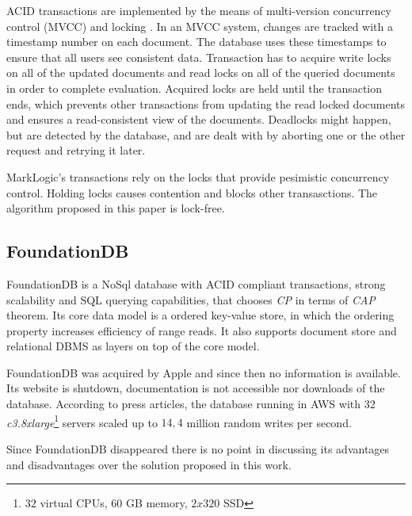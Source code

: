 ACID transactions are implemented by the means of multi-version concurrency control (MVCC) and locking \cite{markLogicUnderstandingTransactions}. In an MVCC system, changes are tracked with a timestamp number on each document. 
The database uses these timestamps to ensure that all users see consistent data. 
Transaction has to acquire write locks on all of the updated documents and read locks on all of the queried documents in order to complete evaluation. Acquired locks are held until the transaction ends, which prevents other transactions from updating the read locked documents and ensures a read-consistent view of the documents. 
Deadlocks might happen, but are detected by the database, and are dealt with by aborting one or the other request and retrying it later.

MarkLogic's transactions rely on the locks that provide pesimistic concurrency control. Holding locks causes contention and blocks other transasctions. 
The algorithm proposed in this paper is lock-free.


\subsection{FoundationDB}
FoundationDB is a NoSql database with ACID compliant transactions, strong scalability and SQL querying capabilities, that chooses \emph{CP} in terms of \emph{CAP} theorem.
Its core data model is a ordered key-value store, in which the ordering property increases efficiency of range reads. It also supports document store and relational DBMS as layers on top of the core model. 

FoundationDB was acquired by Apple \cite{foundationDbAcquired} and since then no information is available. Its website is shutdown, documentation is not accessible nor downloads of the database. According to press articles, the database running in AWS with $32$ \emph{c3.8xlarge}\footnote{$32$ virtual CPUs, $60$ GB memory, $2x320$ SSD} servers scaled up to $14,4$ million random writes per second.

Since FoundationDB disappeared there is no point in discussing its advantages and disadvantages over the solution proposed in this work.

